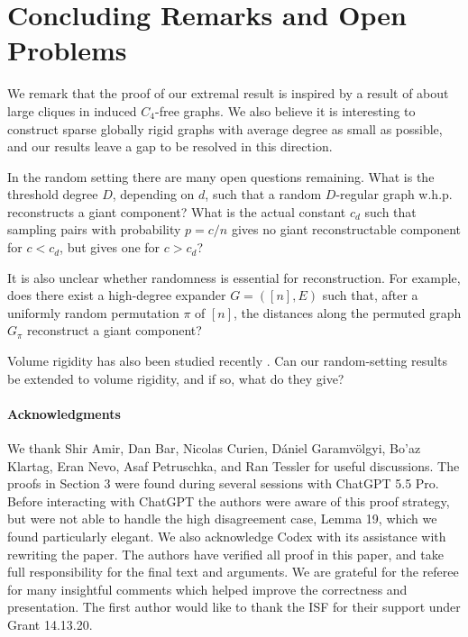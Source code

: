 \documentclass[fullpage,11pt]{article}
\theoremstyle{break}
\theoremstyle{definition}
\theoremstyle{break}
\begin{document}
\section{Concluding Remarks and Open Problems}


We remark that the proof of our extremal result is inspired by a result of \cite{Solymosi} about large cliques in induced $C_4$-free graphs. We also  believe it is interesting to construct sparse globally rigid graphs with average degree as small as possible, and our results leave a gap to be resolved in this direction.


In the random setting there are many open questions remaining. What is the threshold degree $D$, depending on $d$, such that a random $D$-regular graph w.h.p. reconstructs a giant component? What is the actual constant $c_d$ such that sampling pairs with probability $p=c/n$ gives no giant reconstructable component for $c<c_d$, but gives one for $c>c_d$?

It is also unclear whether randomness is essential for reconstruction. For example, does there exist a high-degree expander \(G=([n],E)\) such that, after a uniformly random permutation \(\pi\) of \([n]\), the distances along the permuted graph \(G_\pi\) reconstruct a giant component?

Volume rigidity has also been studied recently \cite{bulavka2025volume,lew2025kvolume}. Can our random-setting results be extended to volume rigidity, and if so, what do they give?

\paragraph{Acknowledgments} We thank Shir Amir, Dan Bar, Nicolas Curien, Dániel Garamvölgyi, Bo'az Klartag, Eran Nevo, Asaf Petruschka, and Ran Tessler for useful discussions. The proofs in Section 3 were found during several sessions with ChatGPT 5.5 Pro. Before interacting with ChatGPT the authors were aware of this proof strategy, but were not able to handle the high disagreement case, Lemma 19, which we found particularly elegant. We also acknowledge Codex with its assistance with rewriting the paper. The authors have verified all proof in this paper, and take full responsibility for the final text and arguments. We are grateful for the referee for many insightful comments which helped improve the correctness and  presentation. The first author would like to thank the ISF for their support under Grant 14.13.20.




\end{document}
